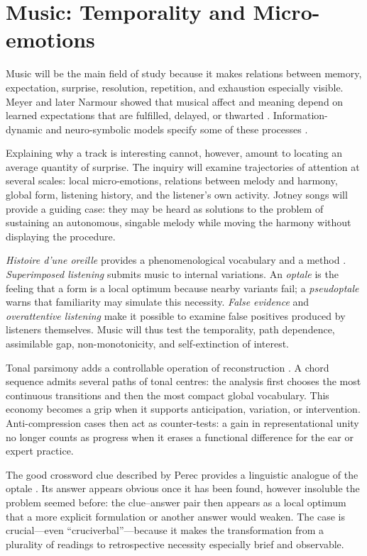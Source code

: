 \documentclass[11pt,a4paper]{article}
\begin{document}
\section{Music: Temporality and Micro-emotions}

Music will be the main field of study because it makes relations
between memory, expectation, surprise, resolution, repetition, and exhaustion
especially visible. Meyer and later Narmour showed that musical affect and
meaning depend on learned expectations that are fulfilled, delayed, or thwarted
\parencite{meyer1956emotion,narmour1990basic,narmour1992complexity}.
Information-dynamic and neuro-symbolic models specify some of these processes
\parencite{abdallah2009information,berger1999expectations,gang1999unified}.

Explaining why a track is interesting cannot, however, amount to locating an
average quantity of surprise. The inquiry will examine trajectories of
attention at several scales: local micro-emotions, relations between melody and
harmony, global form, listening history, and the listener's own activity.
Jotney songs will provide a guiding case: they may be heard as solutions to the
problem of sustaining an autonomous, singable melody while moving the harmony
without displaying the procedure.

\emph{Histoire d'une oreille} provides a phenomenological vocabulary and a
method \parencite{pachet2018oreille}. \emph{Superimposed listening} submits
music to internal variations. An \emph{optale} is the feeling that a form is a
local optimum because nearby variants fail; a \emph{pseudoptale} warns that
familiarity may simulate this necessity. \emph{False evidence} and
\emph{overattentive listening} make it possible to examine false positives
produced by listeners themselves. Music will thus test the temporality, path
dependence, assimilable gap, non-monotonicity, and self-extinction of interest.

Tonal parsimony adds a controllable operation of reconstruction
\parencite{pachet2026tonalparsimony}. A chord sequence admits several paths of
tonal centres: the analysis first chooses the most continuous transitions and
then the most compact global vocabulary. This economy becomes a grip when it
supports anticipation, variation, or intervention. Anti-compression cases then
act as counter-tests: a gain in representational unity no longer counts as
progress when it erases a functional difference for the ear or expert practice.

The good crossword clue described by Perec provides a linguistic analogue of
the optale \parencite{perec1999motscroises}. Its answer appears obvious once it
has been found, however insoluble the problem seemed before: the clue--answer pair then
appears as a local optimum that a more explicit formulation or another answer
would weaken. The case is crucial---even ``cruciverbal''---because it makes the
transformation from a plurality of readings to retrospective necessity
especially brief and observable.
\end{document}
